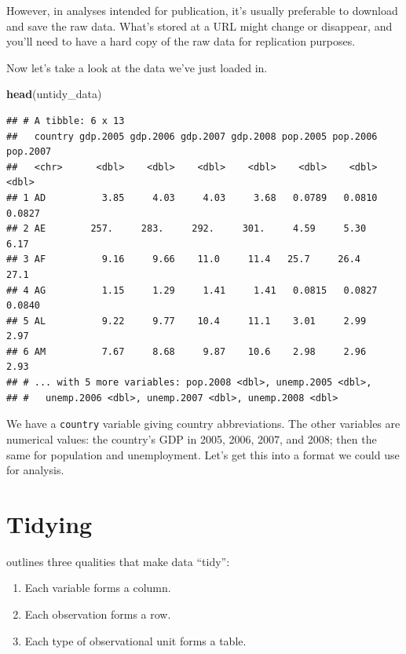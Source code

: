 \documentclass[
  12pt,
  oneside,openany]{book}
\newenvironment{Shaded}{\begin{snugshade}}{\end{snugshade}}
\newcommand{\KeywordTok}[1]{\textcolor[rgb]{0.13,0.29,0.53}{\textbf{#1}}}
\newcommand{\NormalTok}[1]{#1}
\providecommand{\tightlist}{%
  \setlength{\itemsep}{0pt}\setlength{\parskip}{0pt}}
\begin{document}
However, in analyses intended for publication, it's usually preferable to download and save the raw data. What's stored at a URL might change or disappear, and you'll need to have a hard copy of the raw data for replication purposes.

Now let's take a look at the data we've just loaded in.

\begin{Shaded}
\begin{Highlighting}[]
\KeywordTok{head}\NormalTok{(untidy\_data)}
\end{Highlighting}
\end{Shaded}

\begin{verbatim}
## # A tibble: 6 x 13
##   country gdp.2005 gdp.2006 gdp.2007 gdp.2008 pop.2005 pop.2006 pop.2007
##   <chr>      <dbl>    <dbl>    <dbl>    <dbl>    <dbl>    <dbl>    <dbl>
## 1 AD          3.85     4.03     4.03     3.68   0.0789   0.0810   0.0827
## 2 AE        257.     283.     292.     301.     4.59     5.30     6.17  
## 3 AF          9.16     9.66    11.0     11.4   25.7     26.4     27.1   
## 4 AG          1.15     1.29     1.41     1.41   0.0815   0.0827   0.0840
## 5 AL          9.22     9.77    10.4     11.1    3.01     2.99     2.97  
## 6 AM          7.67     8.68     9.87    10.6    2.98     2.96     2.93  
## # ... with 5 more variables: pop.2008 <dbl>, unemp.2005 <dbl>,
## #   unemp.2006 <dbl>, unemp.2007 <dbl>, unemp.2008 <dbl>
\end{verbatim}

We have a \texttt{country} variable giving country abbreviations. The other variables are numerical values: the country's GDP in 2005, 2006, 2007, and 2008; then the same for population and unemployment. Let's get this into a format we could use for analysis.

\hypertarget{tidying}{%
\section{Tidying}\label{tidying}}

\citet{Wickham:2014vp} outlines three qualities that make data ``tidy'':

\begin{enumerate}
\def\labelenumi{\arabic{enumi}.}
\tightlist
\item
  Each variable forms a column.
\item
  Each observation forms a row.
\item
  Each type of observational unit forms a table.
\end{enumerate}
\end{document}
